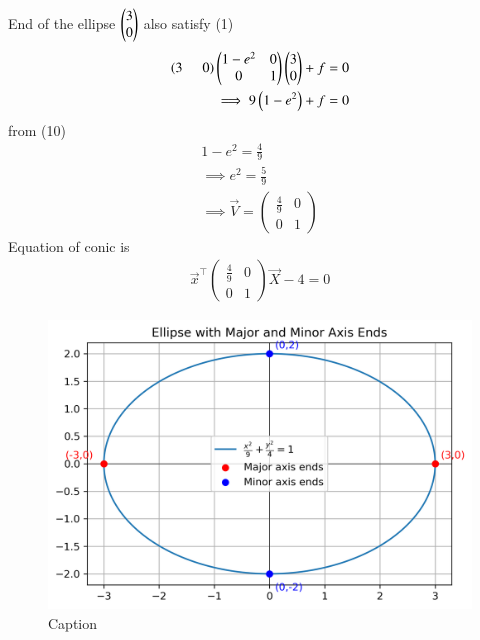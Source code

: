 \documentclass[journal]{IEEEtran}
\begin{document}
End of the ellipse $\begin{pmatrix}3\\0\end{pmatrix}$ also satisfy (1)
\begin{align}
    \left(3\hspace{0.5cm} 0\right) \begin{pmatrix}
        1-e^2 & 0\\
        0 & 1
    \end{pmatrix}\begin{pmatrix}3\\0\end{pmatrix} +f=0\\
    \implies 9\left(1-e^2\right)+f=0
\end{align}
from (10)
\begin{align}
    1-e^2=\frac{4}{9}\\
    \implies e^2=\frac{5}{9}\\
    \implies \vec{V}= \begin{pmatrix}
        \frac{4}{9} & 0\\
        0 & 1
    \end{pmatrix}
\end{align}
Equation of conic is 
\begin{align}
   \vec{x}^\top \begin{pmatrix}
        \frac{4}{9} & 0\\
        0 & 1
    \end{pmatrix} \vec{X}-4=0
\end{align}

\begin{figure}
    \centering
    \includegraphics[width=0.9\linewidth]{figs/01.png}
    \caption{Caption}
    \label{fig:placeholder}
\end{figure}
\end{document}
